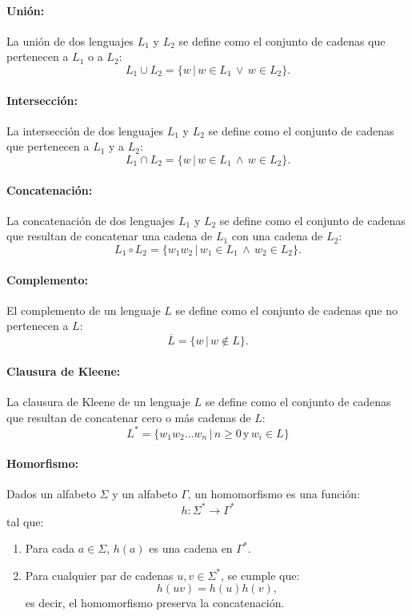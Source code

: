 \documentclass[12pt]{article}
\begin{document}
\paragraph{Unión:} La unión de dos lenguajes $L_1$ y $L_2$ se define como el conjunto de cadenas que
pertenecen a $L_1$ o a $L_2$:
$$L_1\cup L_2=\{w\,|\,w\in L_1\,\vee\,w\in L_2\}.$$

\paragraph{Intersección:} La intersección de dos lenguajes $L_1$ y $L_2$ se define como el conjunto de
cadenas que pertenecen a $L_1$ y a $L_2$:
$$L_1\cap L_2=\{w\,|\,w\in L_1\,\wedge\,w\in L_2\}.$$

\paragraph{Concatenación:} La concatenación de dos lenguajes $L_1$ y $L_2$ se define como el conjunto
de cadenas que resultan de concatenar una cadena de $L_1$ con una cadena de $L_2$:
$$L_1\circ L_2=\{w_1w_2\,|\,w_1\in L_1\,\wedge\,w_2\in L_2\}.$$
\paragraph{Complemento:} El complemento de un lenguaje $L$ se define como el conjunto de cadenas que no
pertenecen a $L$:
$$\overline{L}=\{w\,|\,w\notin L\}.$$
\paragraph{Clausura de Kleene:} La clausura de Kleene de un lenguaje $L$ se define como el conjunto de
cadenas que resultan de concatenar cero o más cadenas de $L$:
$$L^*=\{w_1w_2\ldots w_n\,|\,n\geq 0\,\text{y}\,w_i\in L\}$$

\paragraph{Homorfismo:} Dados un alfabeto \( \Sigma \) y un alfabeto \( \Gamma \), un homomorfismo es una función:
\[
      h: \Sigma^* \to \Gamma^*
\]
tal que:
\begin{enumerate}
      \item Para cada \( a \in \Sigma \), \( h(a) \) es una cadena en \( \Gamma^* \).
      \item Para cualquier par de cadenas \( u, v \in \Sigma^* \), se cumple que:
            \[
                  h(uv) = h(u) h(v),
            \]
            es decir, el homomorfismo preserva la concatenación.
\end{enumerate}
\end{document}
